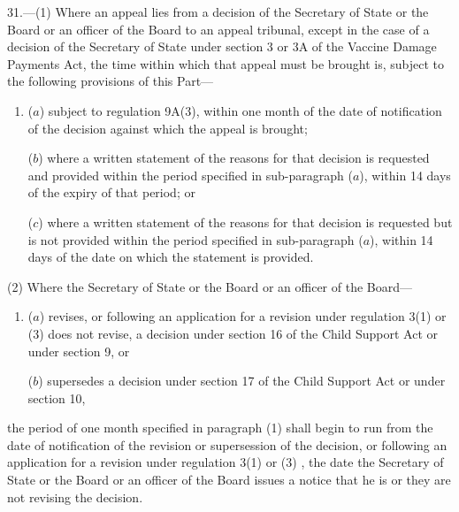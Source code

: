\documentclass[12pt,a4paper]{article}
\begin{document}
31.—(1) Where an appeal lies from a decision of the Secretary of State 
or the Board or an officer of the Board  %
to an appeal tribunal, except in the case of a decision of the Secretary of State under section 3 or 3A of the Vaccine Damage Payments Act, the time within which that appeal must be brought is, subject to the following provisions of this Part—
\begin{enumerate}\item[]
%

($a$) subject to regulation 9A(3), within one month of the date of notification of the decision against which the appeal is brought;

($b$) where a written statement of the reasons for that decision is requested and provided within the period specified in sub-paragraph ($a$), within 14 days of the expiry of that period; or

($c$) where a written statement of the reasons for that decision is requested but is not provided within the period specified in sub-paragraph ($a$), within 14 days of the date on which the statement is provided.
\end{enumerate}

(2) Where the Secretary of State
or the Board or an officer of the Board—  %
\begin{enumerate}\item[]
($a$) revises, or following an application for a revision under regulation 3(1) or (3)
does not revise, a decision under section 16 of the Child Support Act or under section 9, or

($b$) supersedes a decision under section 17 of the Child Support Act or under section 10,
\end{enumerate}
the period of one month specified in paragraph (1) shall begin to run from the date of notification of the revision or supersession of the decision, or following an application for a revision under regulation 3(1) or (3)%
, the date the Secretary of State 
or the Board or an officer of the Board  %
issues a notice that he is 
or they are  %
not revising the decision.
\end{document}
